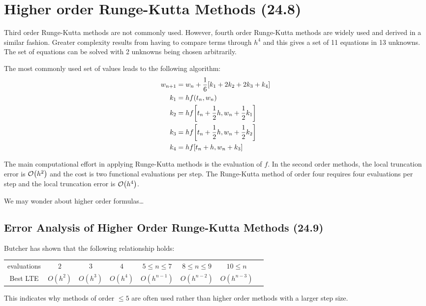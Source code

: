 \section{Higher order Runge-Kutta Methods (24.8)}
Third order Runge-Kutta methods are not commonly used. However, fourth order
Runge-Kutta methods are widely used and derived in a similar fashion. Greater
complexity results from having to compare terms through $h^4$ and this gives a
set of 11 equations in 13 unknowns. The set of equations can be solved with 2
unknowns being chosen arbitrarily. 

The most commonly used set of values leads to the following algorithm:
\begin{align*}
  w_{n+1} &= w_n+\frac{1}{6}\bqty{k_1+2k_2+2k_3+k_4} \\
  k_1 &= hf(t_n, w_n) \\
  k_2 &= hf\bqty{t_n+\frac{1}{2}h, w_n + \frac{1}{2}k_1} \\
  k_3 &= hf\bqty{t_n+\frac{1}{2}h, w_n + \frac{1}{2}k_2} \\
  k_4 &= hf\bqty{t_n+h, w_n + k_3}
\end{align*}

The main computational effort in applying Runge-Kutta methods is the evaluation
of $f$. In the second order methods, the local truncation error is $\order{h^2}$
and the cost is two functional evaluations per step. The Runge-Kutta method of
order four requires four evaluations per step and the local truncation error is
$\order{h^4}$.

We may wonder about higher order formulas\dots

\subsection{Error Analysis of Higher Order Runge-Kutta Methods (24.9)}
Butcher has shown that the following relationship holds:

\begin{tabular}{c|ccccccc}
  evaluations & $2$ & $3$ & $4$ & $5\leq n\leq7$ & $8\leq n\leq9$ & $10\leq n$\\
  Best LTE & $O(h^2)$ & $O(h^3)$ & $O(h^4)$ & $O(h^{n-1})$ &
  $O(h^{n-2})$ &$O(h^{n-3})$
\end{tabular}

This indicates why methods of order $\leq 5$ are often used rather than higher
order methods with a larger step size.

